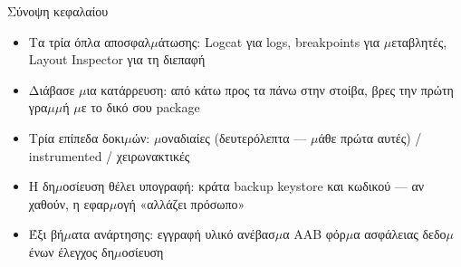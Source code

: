 \begin{tcbsummary}{Σύνοψη κεφαλαίου}
\begin{itemize}
  \item Τα τρία όπλα αποσφαλ$\mu$άτωσης: Logcat για logs, breakpoints για $\mu$εταβλητές, Layout Inspector για τη διεπαφή
  \item Διάβασε $\mu$ια κατάρρευση: από κάτω προς τα πάνω στην στοίβα, βρες την πρώτη γρα$\mu$$\mu$ή $\mu$ε το δικό σου package
  \item Τρία επίπεδα δοκι$\mu$ών: $\mu$οναδιαίες (δευτερόλεπτα — $\mu$άθε πρώτα αυτές) / instrumented / χειρωνακτικές
  \item Η δη$\mu$οσίευση θέλει υπογραφή: κράτα backup keystore και κωδικού — αν χαθούν, η εφαρ$\mu$ογή «αλλάζει πρόσωπο»
  \item Έξι βή$\mu$ατα ανάρτησης: εγγραφή υλικό ανέβασ$\mu$α AAB φόρ$\mu$α ασφάλειας δεδο$\mu$ένων έλεγχος δη$\mu$οσίευση
\end{itemize}

\end{tcbsummary}
